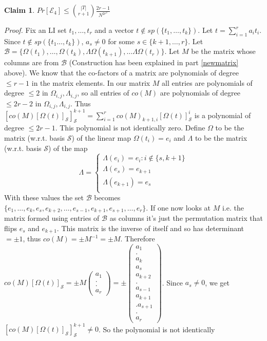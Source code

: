 \documentclass[letterpaper,USenglish,numberwithinsect]{lipics}
\newcommand{\MB}{\mathcal{B}}
\newcommand{\ME}{\mathcal{E}}
\newcommand{\MS}{\mathcal{S}}
\newtheorem{claim}[theorem]{Claim}
\begin{document}
\begin{claim}
 $Pr[\ME_4]\leq {|T|\choose r+1}\frac{2r-1}{N^{2r^2}}$
\end{claim}
\emph{Proof.}
 Fix an LI set $t_1,\ldots,t_r$ and a vector $t\notin sp(\{t_1,\ldots,t_k\})$. Let $t = \sum\limits_{i=1}^r a_it_i$. Since
 $t\notin sp(\{t_1\ldots,t_k\})$, $a_s\neq 0$ for some $s\in \{k+1,\ldots,r\}$.
 Let $\MB = \{\Omega(t_1),\ldots,\Omega(t_k), \Lambda\Omega(t_{k+1}),\ldots \Lambda\Omega(t_r)\}$.
 Let $M$ be the matrix whose columns are from $\MB$
 (Construction has been explained in part \ref{newmatrix} above). We know that the co-factors of a matrix are
 polynomials of degree $\leq r-1$ in the matrix elements.
 In our matrix $M$ all entries are polynomials of degree $\leq 2$ in $\Omega_{i,j},\Lambda_{i,j}$, so all entries of $co(M)$ are polynomials of degree
 $\leq 2r-2$ in $\Omega_{i,j}, \Lambda_{i,j}$. Thus $[co(M)[\Omega(t)]_\MS]^{k+1}_{\MS} =
 \sum\limits_{i=1}^r co(M)_{k+1,i}[\Omega(t)]^i_\MS$ is a polynomial of degree $\leq 2r-1$. This polynomial is not identically zero. Define
 $\Omega$ to be the matrix (w.r.t. basis $\MS$) of the linear map $\Omega(t_i) = e_i$ and $\Lambda$ to be the matrix (w.r.t. basis $\MS$) of the map
\begin{displaymath}
  \Lambda = \left\{
     \begin{array}{lr}
       \Lambda(e_i)=e_i : i\notin\{s,k+1\}\\
 \Lambda(e_s) = e_{k+1}\\
 \Lambda(e_{k+1})=e_s\\
     \end{array}
   \right.
\end{displaymath}
With these values the set $\MB$ becomes $\{e_1,\ldots,e_k,e_s,e_{k+2},\ldots,e_{s-1},e_{k+1},e_{s+1},\ldots,e_r\}$. If one now
looks at $M$ i.e. the matrix formed using entries of $\MB$ as columns it's just the permutation matrix that flips $e_s$ and $e_{k+1}$.
This matrix is the inverse of itself and so has determinant $=\pm1$, thus $co(M) = \pm M^{-1} = \pm M$. Therefore $co(M)[\Omega(t)]_\MS = \pm M \left(\begin{array}{c} a_1\\.\\.
\\a_r\end{array}\right) = \pm \left(\begin{array}{c} a_1\\.\\a_k\\a_s\\a_{k+2}\\.\\a_{s-1}\\a_{k+1}\\.a_{s+1}\\.\\a_r\end{array}\right)$. Since $a_s \neq 0$, we get $[co(M)[\Omega(t)]_\MS]^{k+1}_\MS \neq 0$. So the polynomial is not identically
\end{document}
